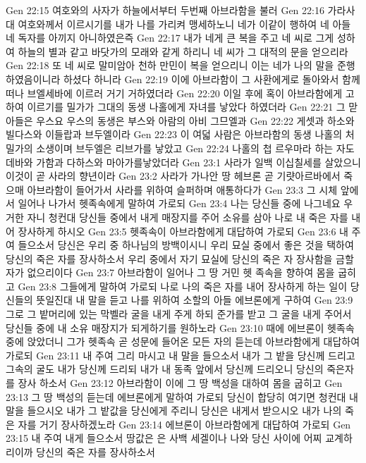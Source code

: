 Gen 22:15  여호와의 사자가 하늘에서부터 두번째 아브라함을 불러
Gen 22:16  가라사대 여호와께서 이르시기를 내가 나를 가리켜 맹세하노니 네가 이같이 행하여 네 아들 네 독자를 아끼지 아니하였은즉
Gen 22:17  내가 네게 큰 복을 주고 네 씨로 그게 성하여 하늘의 별과 같고 바닷가의 모래와 같게 하리니 네 씨가 그 대적의 문을 얻으리라
Gen 22:18  또 네 씨로 말미암아 천하 만민이 복을 얻으리니 이는 네가 나의 말을 준행하였음이니라 하셨다 하니라
Gen 22:19  이에 아브라함이 그 사환에게로 돌아와서 함께 떠나 브엘세바에 이르러 거기 거하였더라
Gen 22:20  이일 후에 혹이 아브라함에게 고하여 이르기를 밀가가 그대의 동생 나홀에게 자녀를 낳았다 하였더라
Gen 22:21  그 맏아들은 우스요 우스의 동생은 부스와 아람의 아비 그므엘과
Gen 22:22  게셋과 하소와 빌다스와 이들랍과 브두엘이라
Gen 22:23  이 여덟 사람은 아브라함의 동생 나홀의 처 밀가의 소생이며 브두엘은 리브가를 낳았고
Gen 22:24  나홀의 첩 르우마라 하는 자도 데바와 가함과 다하스와 마아가를낳았더라
Gen 23:1  사라가 일백 이십칠세를 살았으니 이것이 곧 사라의 향년이라
Gen 23:2  사라가 가나안 땅 헤브론 곧 기럇아르바에서 죽으매 아브라함이 들어가서 사라를 위하여 슬퍼하며 애통하다가
Gen 23:3  그 시체 앞에서 일어나 나가서 헷족속에게 말하여 가로되
Gen 23:4  나는 당신들 중에 나그네요 우거한 자니 청컨대 당신들 중에서 내게 매장지를 주어 소유를 삼아 나로 내 죽은 자를 내어 장사하게 하시오
Gen 23:5  헷족속이 아브라함에게 대답하여 가로되
Gen 23:6  내 주여 들으소서 당신은 우리 중 하나님의 방백이시니 우리 묘실 중에서 좋은 것을 택하여 당신의 죽은 자를 장사하소서 우리 중에서 자기 묘실에 당신의 죽은 자 장사함을 금할 자가 없으리이다
Gen 23:7  아브라함이 일어나 그 땅 거민 헷 족속을 향하여 몸을 굽히고
Gen 23:8  그들에게 말하여 가로되 나로 나의 죽은 자를 내어 장사하게 하는 일이 당신들의 뜻일진대 내 말을 듣고 나를 위하여 소할의 아들 에브론에게 구하여
Gen 23:9  그로 그 밭머리에 있는 막벨라 굴을 내게 주게 하되 준가를 받고 그 굴을 내게 주어서 당신들 중에 내 소유 매장지가 되게하기를 원하노라
Gen 23:10  때에 에브론이 헷족속 중에 앉았더니 그가 헷족속 곧 성문에 들어온 모든 자의 듣는데 아브라함에게 대답하여 가로되
Gen 23:11  내 주여 그리 마시고 내 말을 들으소서 내가 그 밭을 당신께 드리고 그속의 굴도 내가 당신께 드리되 내가 내 동족 앞에서 당신께 드리오니 당신의 죽은자를 장사 하소서
Gen 23:12  아브라함이 이에 그 땅 백성을 대하여 몸을 굽히고
Gen 23:13  그 땅 백성의 듣는데 에브론에게 말하여 가로되 당신이 합당히 여기면 청컨대 내 말을 들으시오 내가 그 밭값을 당신에게 주리니 당신은 내게서 받으시오 내가 나의 죽은 자를 거기 장사하겠노라
Gen 23:14  에브론이 아브라함에게 대답하여 가로되
Gen 23:15  내 주여 내게 들으소서 땅값은 은 사백 세겔이나 나와 당신 사이에 어찌 교계하리이까 당신의 죽은 자를 장사하소서
